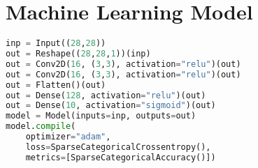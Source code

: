 \appendix

\chapter{Machine Learning Model} \label{ap:model}
\begin{lstlisting}[language=Python]
inp = Input((28,28))
out = Reshape((28,28,1))(inp)
out = Conv2D(16, (3,3), activation="relu")(out)
out = Conv2D(16, (3,3), activation="relu")(out)
out = Flatten()(out)
out = Dense(128, activation="relu")(out)
out = Dense(10, activation="sigmoid")(out)
model = Model(inputs=inp, outputs=out)
model.compile(
	optimizer="adam",
	loss=SparseCategoricalCrossentropy(),
	metrics=[SparseCategoricalAccuracy()])
\end{lstlisting}